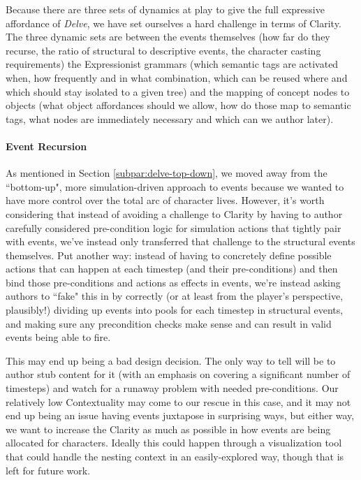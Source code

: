 Because there are three sets of dynamics at play to give the full expressive affordance of \textit{Delve}, we have set ourselves a hard challenge in terms of Clarity. The three dynamic sets are between the events themselves (how far do they recurse, the ratio of structural to descriptive events, the character casting requirements) the Expressionist grammars (which semantic tags are activated when, how frequently and in what combination, which can be reused where and which should stay isolated to a given tree) and the mapping of concept nodes to objects (what object affordances should we allow, how do those map to semantic tags, what nodes are immediately necessary and which can we author later).

\paragraph{Event Recursion}\label{par:delve-event-recursion}

As mentioned in Section \ref{subpar:delve-top-down}, we moved away from the ``bottom-up", more simulation-driven approach to events because we wanted to have more control over the total arc of character lives. However, it's worth considering that instead of avoiding a challenge to Clarity by having to author carefully considered pre-condition logic for simulation actions that tightly pair with events, we've instead only transferred that challenge to the structural events themselves. Put another way: instead of having to concretely define possible actions that can happen at each timestep (and their pre-conditions) and then bind those pre-conditions and actions as effects in events, we're instead asking authors to ``fake" this in by correctly (or at least from the player's perspective, plausibly!) dividing up events into pools for each timestep in structural events, and making sure any precondition checks make sense and can result in valid events being able to fire.

This may end up being a bad design decision. The only way to tell will be to author stub content for it (with an emphasis on covering a significant number of timesteps) and watch for a runaway problem with needed pre-conditions. Our relatively low Contextuality may come to our rescue in this case, and it may not end up being an issue having events juxtapose in surprising ways, but either way, we want to increase the Clarity as much as possible in how events are being allocated for characters. Ideally this could happen through a visualization tool that could handle the nesting context in an easily-explored way, though that is left for future work.

